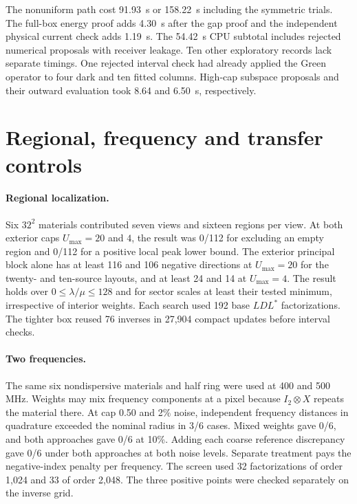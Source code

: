 The nonuniform path cost 91.93~s or 158.22~s including the symmetric trials. The full-box energy proof adds 4.30~s after the gap proof and the independent physical current check adds 1.19~s. The 54.42~s CPU subtotal includes rejected numerical proposals with receiver leakage. Ten other exploratory records lack separate timings. One rejected interval check had already applied the Green operator to four dark and ten fitted columns. High-cap subspace proposals and their outward evaluation took 8.64 and 6.50~s, respectively.

\section{Regional, frequency and transfer controls}\label{app:controls}

\paragraph{Regional localization.}
Six $32^2$ materials contributed seven views and sixteen regions per view. At both exterior caps $U_{\max}=20$ and $4$, the result was 0/112 for excluding an empty region and 0/112 for a positive local peak lower bound. The exterior principal block alone has at least 116 and 106 negative directions at $U_{\max}=20$ for the twenty- and ten-source layouts, and at least 24 and 14 at $U_{\max}=4$. The result holds over $0\le\lambda/\mu\le128$ and for sector scales at least their tested minimum, irrespective of interior weights. Each search used 192 base $LDL^*$ factorizations. The tighter box reused 76 inverses in 27,904 compact updates before interval checks.

\paragraph{Two frequencies.}
The same six nondispersive materials and half ring were used at 400 and 500 MHz. Weights may mix frequency components at a pixel because $I_2\otimes X$ repeats the material there. At cap 0.50 and 2\% noise, independent frequency distances in quadrature exceeded the nominal radius in 3/6 cases. Mixed weights gave 0/6, and both approaches gave 0/6 at 10\%. Adding each coarse reference discrepancy gave 0/6 under both approaches at both noise levels. Separate treatment pays the negative-index penalty per frequency. The screen used 32 factorizations of order 1,024 and 33 of order 2,048. The three positive points were checked separately on the inverse grid.

